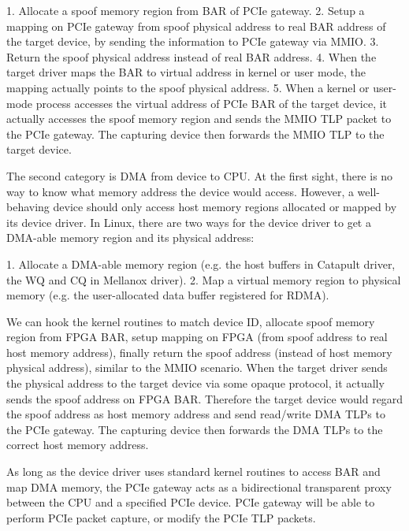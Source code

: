 1. Allocate a spoof memory region from BAR of PCIe gateway.
2. Setup a mapping on PCIe gateway from spoof physical address to real BAR address of the target device, by sending the information to PCIe gateway via MMIO.
3. Return the spoof physical address instead of real BAR address.
4. When the target driver maps the BAR to virtual address in kernel or user mode, the mapping actually points to the spoof physical address.
5. When a kernel or user-mode process accesses the virtual address of PCIe BAR of the target device, it actually accesses the spoof memory region and sends the MMIO TLP packet to the PCIe gateway. The capturing device then forwards the MMIO TLP to the target device.

The second category is DMA from device to CPU. At the first sight, there is no way to know what memory address the device would access. However, a well-behaving device should only access host memory regions allocated or mapped by its device driver. In Linux, there are two ways for the device driver to get a DMA-able memory region and its physical address:

1. Allocate a DMA-able memory region (e.g. the host buffers in Catapult driver, the WQ and CQ in Mellanox driver).
2. Map a virtual memory region to physical memory (e.g. the user-allocated data buffer registered for RDMA).

We can hook the kernel routines to match device ID, allocate spoof memory region from FPGA BAR, setup mapping on FPGA (from spoof address to real host memory address), finally return the spoof address (instead of host memory physical address), similar to the MMIO scenario. When the target driver sends the physical address to the target device via some opaque protocol, it actually sends the spoof address on FPGA BAR. Therefore the target device would regard the spoof address as host memory address and send read/write DMA TLPs to the PCIe gateway. The capturing device then forwards the DMA TLPs to the correct host memory address.

As long as the device driver uses standard kernel routines to access BAR and map DMA memory, the PCIe gateway acts as a bidirectional transparent proxy between the CPU and a specified PCIe device. PCIe gateway will be able to perform PCIe packet capture, or modify the PCIe TLP packets.

